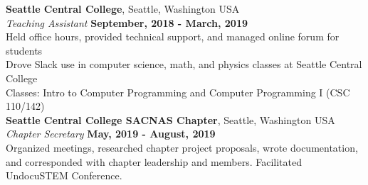\documentclass[margin,line]{res}
\newenvironment{list2}{
  \begin{list}{$\bullet$}{%
      \setlength{\itemsep}{0in}
      \setlength{\parsep}{0in} \setlength{\parskip}{0in}
      \setlength{\topsep}{0in} \setlength{\partopsep}{0in} 
      \setlength{\leftmargin}{0.2in}}}{\end{list}}
\begin{document}
\begin{resume}
{\bf Seattle Central College}, Seattle, Washington USA \\
{\em Teaching Assistant} \hfill {\bf September, 2018  - March, 2019} \\
Held office hours, provided technical support, and managed online forum for students \\
Drove Slack use in computer science, math, and physics classes at Seattle Central College \\
Classes: Intro to Computer Programming and Computer Programming I (CSC 110/142) \\

%
%
%
%
%
{\bf Seattle Central College SACNAS Chapter}, Seattle, Washington USA \\ 
%
{\em Chapter Secretary} \hfill {\bf May, 2019 - August, 2019}\\
  Organized meetings, researched chapter project proposals, wrote documentation, and 
  corresponded with chapter leadership and members. Facilitated UndocuSTEM Conference.

\end{resume}
\end{document}
